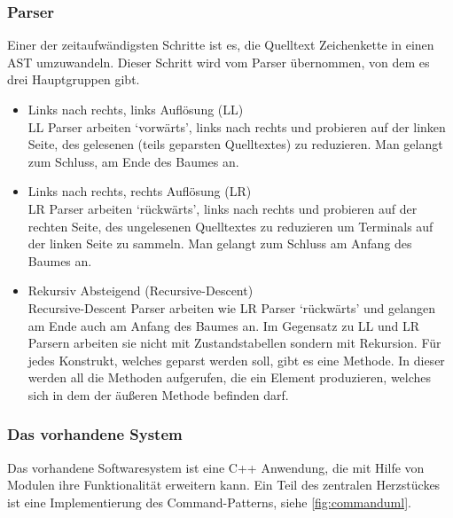     \subsubsection{Parser}
    \label{sssec:Parser}
      Einer der zeitaufwändigsten Schritte ist es, die Quelltext Zeichenkette in einen AST umzuwandeln. Dieser Schritt wird vom Parser übernommen, von dem es drei Hauptgruppen gibt.
      \begin{itemize}
        \item Links nach rechts, links Auflösung (LL) \autocite[S.77\,f.]{eirund2013formale}\\
          LL Parser arbeiten `vorwärts', links nach rechts und probieren auf der linken Seite, des gelesenen (teils geparsten Quelltextes) zu reduzieren. Man gelangt zum Schluss, am Ende des Baumes an.
        \item Links nach rechts, rechts Auflösung (LR) \autocite[S.77\,f.]{eirund2013formale}\\
          LR Parser arbeiten `rückwärts', links nach rechts und probieren auf der rechten Seite, des ungelesenen Quelltextes zu reduzieren um Terminals auf der linken Seite zu sammeln. Man gelangt zum Schluss am Anfang des Baumes an. \autocite{cs143-stanford}
        \item Rekursiv Absteigend (Recursive-Descent)\\
          Recursive-Descent Parser arbeiten wie LR Parser `rückwärts' und gelangen am Ende auch am Anfang des Baumes an. Im Gegensatz zu LL und LR Parsern arbeiten sie nicht mit Zustandstabellen sondern mit Rekursion. Für jedes Konstrukt, welches geparst werden soll, gibt es eine Methode. In dieser werden all die Methoden aufgerufen, die ein Element produzieren, welches sich in dem der äußeren Methode befinden darf.
      \end{itemize}

    \subsubsection{Das vorhandene System}
    \label{sssec:Das vorhandene System}
      Das vorhandene Softwaresystem ist eine C++ Anwendung, die mit Hilfe von Modulen ihre Funktionalität erweitern kann. Ein Teil des zentralen Herzstückes ist eine Implementierung des Command-Patterns, siehe \autoref{fig:commanduml}.

